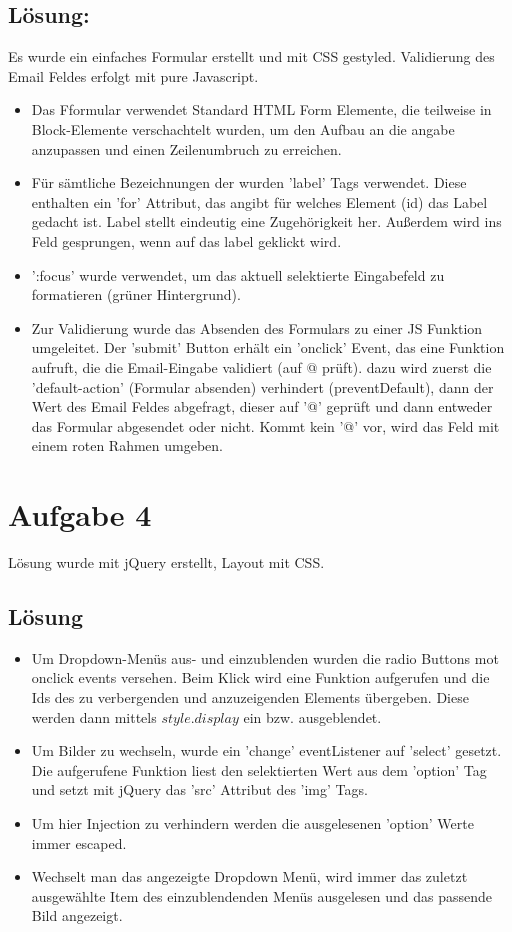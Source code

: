 \documentclass[12pt, a4paper]{report}
\begin{document}
\subsection*{Lösung:}
Es wurde ein einfaches Formular erstellt und mit CSS gestyled. Validierung des Email Feldes erfolgt mit pure Javascript.
\begin{itemize}
	\item Das Fformular verwendet Standard HTML Form Elemente, die teilweise in Block-Elemente verschachtelt wurden, um
	den Aufbau an die angabe anzupassen und einen Zeilenumbruch zu erreichen.
	\item Für sämtliche Bezeichnungen der wurden 'label' Tags verwendet. Diese enthalten ein 'for' Attribut, das angibt für
	welches Element (id) das Label gedacht ist. Label stellt eindeutig eine Zugehörigkeit her. Außerdem wird ins Feld gesprungen, wenn auf das label geklickt wird.
	\item ':focus' wurde verwendet, um das aktuell selektierte Eingabefeld zu formatieren (grüner Hintergrund).
	\item Zur Validierung wurde das Absenden des Formulars zu einer JS Funktion umgeleitet. Der 'submit' Button erhält ein
	'onclick' Event, das eine Funktion aufruft, die die Email-Eingabe validiert (auf @ prüft). dazu wird zuerst die 'default-action' (Formular absenden) verhindert (preventDefault), dann der Wert des Email Feldes abgefragt, dieser auf '@' geprüft und dann entweder das Formular abgesendet oder nicht. Kommt kein '@' vor, wird das Feld mit einem roten Rahmen umgeben.
\end{itemize}

\section*{Aufgabe 4}
Lösung wurde mit jQuery erstellt, Layout mit CSS.
\subsection*{Lösung}
\begin{itemize}
	\item Um Dropdown-Menüs aus- und einzublenden wurden die radio Buttons mot onclick events versehen. Beim Klick wird eine Funktion aufgerufen und die Ids des zu verbergenden und anzuzeigenden Elements übergeben. Diese werden dann mittels $style.display$ ein bzw. ausgeblendet.
	\item Um Bilder zu wechseln, wurde ein 'change' eventListener auf 'select' gesetzt. Die aufgerufene Funktion liest den
	selektierten Wert aus dem 'option' Tag und setzt mit jQuery das 'src' Attribut des 'img' Tags.
	\item Um hier Injection zu verhindern werden die ausgelesenen 'option' Werte immer escaped.
	\item Wechselt man das angezeigte Dropdown Menü, wird immer das zuletzt ausgewählte Item des einzublendenden Menüs ausgelesen und das passende Bild angezeigt.
\end{itemize}
\end{document}

